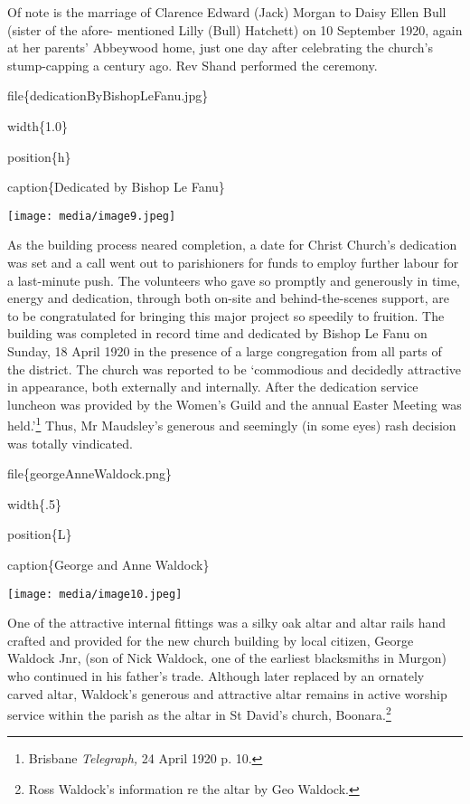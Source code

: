 Of note is the marriage of Clarence Edward (Jack) Morgan to Daisy Ellen
Bull (sister of the afore- mentioned Lilly (Bull) Hatchett) on 10
September 1920, again at her parents' Abbeywood home, just one day after
celebrating the church's stump-capping a century ago. Rev Shand
performed the ceremony.

file\{dedicationByBishopLeFanu.jpg\}

width\{1.0\}

position\{h\}

caption\{Dedicated by Bishop Le Fanu\}

\texttt{[image: media/image9.jpeg]}

As the building process neared completion, a date for Christ Church's
dedication was set and a call went out to parishioners for funds to
employ further labour for a last-minute push. The volunteers who gave so
promptly and generously in time, energy and dedication, through both
on-site and behind-the-scenes support, are to be congratulated for
bringing this major project so speedily to fruition. The building was
completed in record time and dedicated by Bishop Le Fanu on Sunday, 18
April 1920 in the presence of a large congregation from all parts of the
district. The church was reported to be `commodious and decidedly
attractive in appearance, both externally and internally. After the
dedication service luncheon was provided by the Women's Guild and the
annual Easter Meeting was held.'\footnote{Brisbane \emph{Telegraph,} 24
  April 1920 p. 10.} Thus, Mr Maudsley's generous and seemingly (in some
eyes) rash decision was totally vindicated.

file\{georgeAnneWaldock.png\}

width\{.5\}

position\{L\}

caption\{George and Anne Waldock\}

\texttt{[image: media/image10.jpeg]}

One of the attractive internal fittings was a silky oak altar and altar
rails hand crafted and provided for the new church building by local
citizen, George Waldock Jnr, (son of Nick Waldock, one of the earliest
blacksmiths in Murgon) who continued in his father's trade. Although
later replaced by an ornately carved altar, Waldock's generous and
attractive altar remains in active worship service within the parish as
the altar in St David's church, Boonara.\footnote{Ross Waldock's
  information re the altar by Geo Waldock.}

